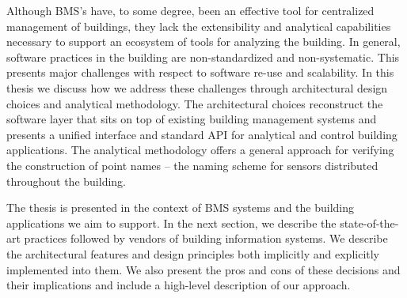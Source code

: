 Although BMS's have, to some degree, been an effective tool for centralized management of buildings, they lack the extensibility
and analytical capabilities necessary to support an ecosystem of tools for analyzing the building.  In general, software
practices in the building are non-standardized and non-systematic.
This presents major challenges with respect to software re-use and scalability.  
In this thesis we discuss how we address these challenges through architectural design choices and analytical methodology.  
The architectural choices reconstruct the software layer that sits on top of existing building management systems and presents
a unified interface and standard API for analytical and control building applications.
The analytical methodology offers a general approach for verifying the construction of point names -- the naming scheme for 
sensors distributed throughout the building.  

The thesis is presented in the context of BMS systems and the building applications we aim to support.
In the next section, we describe the state-of-the-art practices followed by vendors of building information systems.
We describe the architectural features and design principles both implicitly and explicitly implemented into them.
We also present the pros and cons of these decisions and their implications and include a high-level description of our approach.







